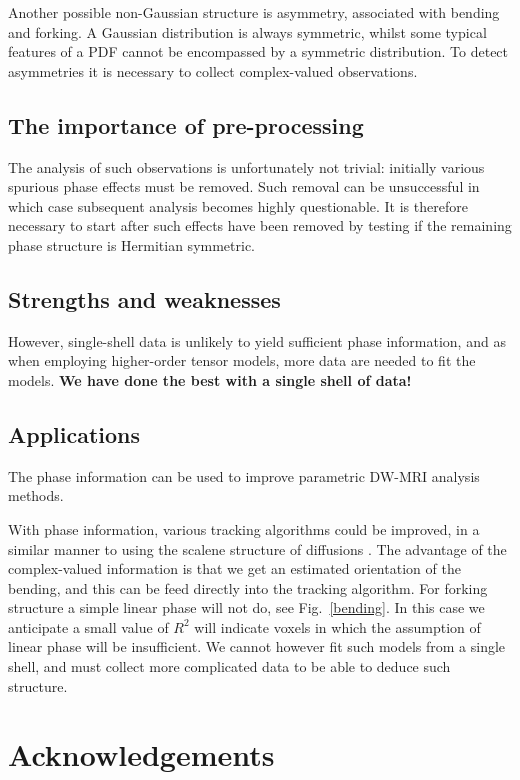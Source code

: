 \documentclass[authoryear,preprint,12pt]{elsarticle}
\begin{document}
Another possible non-Gaussian structure is asymmetry, associated with
bending and forking.  A Gaussian distribution is always symmetric,
whilst some typical features of a PDF cannot be encompassed by a
symmetric distribution.  To detect asymmetries it is necessary to
collect complex-valued observations.

\subsection{The importance of pre-processing}

The analysis of such observations is unfortunately not trivial:
initially various spurious phase effects must be removed.  Such
removal can be unsuccessful in which case subsequent analysis becomes
highly questionable.  It is therefore necessary to start after such
effects have been removed by testing if the remaining phase structure
is Hermitian symmetric.

\subsection{Strengths and weaknesses}

However, single-shell data is unlikely to yield sufficient phase
information, and as when employing higher-order tensor models, more
data are needed to fit the models. \textbf{We have done the best with
  a single shell of data!}

\subsection{Applications}

The phase information can be used to improve parametric DW-MRI
analysis methods.

With phase information, various tracking algorithms could be improved,
in a similar manner to using the scalene structure of diffusions
\citep{Seunarine}.  The advantage of the complex-valued information is
that we get an estimated orientation of the bending, and this can be
feed directly into the tracking algorithm.  For forking structure a
simple linear phase will not do, see Fig.~\ref{bending}.  In this case
we anticipate a small value of $R^2$ will indicate voxels in which the
assumption of linear phase will be insufficient.  We cannot however
fit such models from a single shell, and must collect more complicated
data to be able to deduce such structure.

\section*{Acknowledgements}
\end{document}
